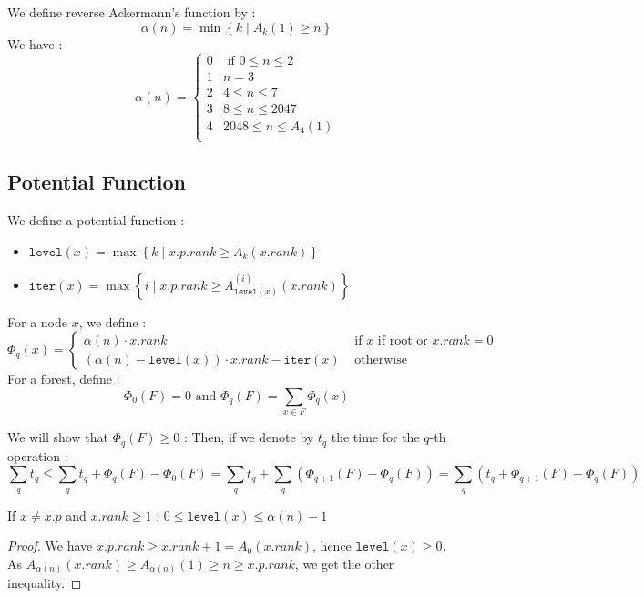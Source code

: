 \documentclass[12pt]{cours}
\begin{document}
\begin{definition}
    We define reverse Ackermann's function by :
    \[
        \alpha(n) = \min \left\{k \mid A_{k}(1) \geq n\right\}
    \]
    We have :
    \[
        \alpha(n) = \begin{cases}
            0 & \text{ if } 0 \leq n \leq 2 \\
            1 & n = 3                       \\
            2 & 4 \leq n \leq 7             \\
            3 & 8 \leq n \leq 2047          \\
            4 & 2048 \leq n \leq A_{4}(1)   \\
        \end{cases}
    \]
\end{definition}

\subsection{Potential Function}
We define a potential function :
\begin{definition}
    \begin{itemize}
        \item $\texttt{level}(x) = \max \left\{k \mid x.p.rank \geq A_{k}(x.rank)\right\}$
        \item $\texttt{iter}(x) = \max \left\{i \mid x.p.rank \geq A_{\texttt{level}(x)}^{(i)}(x.rank)\right\}$
    \end{itemize}
    For a node $x$, we define :
    \[
        \Phi_{q}(x) = \begin{cases}
            \alpha(n)\cdot x.rank                                                       & \text{ if $x$ if root or } x.rank = 0 \\
            \left(\alpha(n) - \texttt{level}(x)\right)  \cdot x.rank - \texttt{iter}(x) & \text{ otherwise}
        \end{cases}
    \]
    For a forest, define :
    \[
        \Phi_{0}(F) = 0 \text{ and } \Phi_{q}(F) = \sum_{x \in F} \Phi_{q}(x)
    \]
\end{definition}

We will show that $\Phi_{q}(F) \geq 0$ :
Then, if we denote by $t_{q}$ the time for the $q$-th operation :
\[
    \sum_{q} t_{q} \leq \sum_{q} t_{q} + \Phi_{q}(F) - \Phi_{0}(F) = \sum_{q}t_{q} + \sum_{q}\left(\Phi_{q + 1}(F) - \Phi_{q}(F)\right) = \sum_{q}\left(t_{q} + \Phi_{q + 1}(F) - \Phi_{q}(F)\right)
\]

\begin{lemma}
    If $x \neq x.p$ and $x.rank \geq 1$ : $0 \leq \texttt{level}(x) \leq \alpha(n) - 1$
\end{lemma}
\begin{proof}
    We have $x.p.rank \geq x.rank + 1 = A_{0}(x.rank)$, hence $\texttt{level}(x) \geq 0$.\\
    As $A_{\alpha(n)}(x.rank) \geq A_{\alpha(n)}(1) \geq n \geq x.p.rank$, we get the other inequality.
\end{proof}
\end{document}
